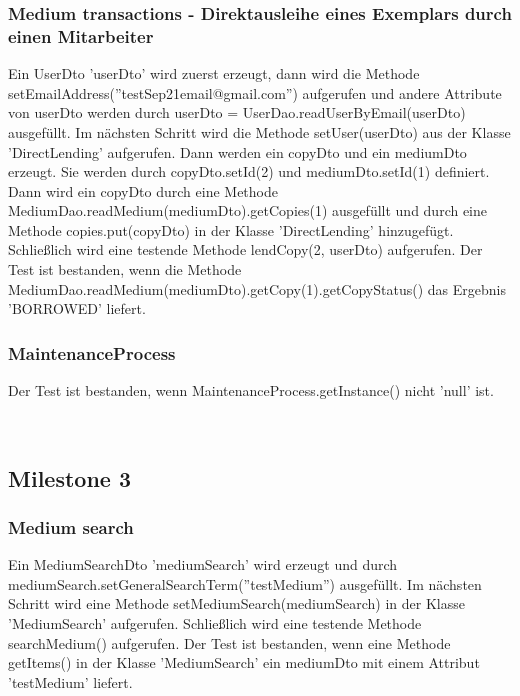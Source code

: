 \documentclass{article}
\begin{document}
\subsubsection{Medium transactions - Direktausleihe eines Exemplars durch einen Mitarbeiter}
Ein UserDto 'userDto' wird zuerst erzeugt, dann wird die Methode \linebreak setEmailAddress(''testSep21email@gmail.com'') aufgerufen und andere Attribute von userDto werden durch userDto = UserDao.readUserByEmail(userDto) ausgefüllt. Im nächsten Schritt wird die Methode setUser(userDto) aus der Klasse 'DirectLending' aufgerufen. Dann werden ein copyDto und ein mediumDto erzeugt. Sie werden durch copyDto.setId(2) und mediumDto.setId(1) definiert. Dann wird ein copyDto durch eine Methode MediumDao.readMedium(mediumDto).getCopies(1) ausgefüllt und durch eine Methode copies.put(copyDto) in der Klasse 'DirectLending' hinzugefügt. Schließlich wird eine testende Methode lendCopy(2, userDto) aufgerufen. Der Test ist bestanden, wenn die Methode MediumDao.readMedium(mediumDto).getCopy(1).getCopyStatus() das Ergebnis 'BORROWED' liefert.

\subsubsection{MaintenanceProcess}
Der Test ist bestanden, wenn MaintenanceProcess.getInstance() nicht 'null' ist.

­\subsection{Milestone 3}
\subsubsection{Medium search}
Ein MediumSearchDto 'mediumSearch' wird erzeugt und durch \linebreak mediumSearch.setGeneralSearchTerm(''testMedium'') ausgefüllt. Im nächsten Schritt wird eine Methode setMediumSearch(mediumSearch) in der Klasse 'MediumSearch' aufgerufen. Schließlich wird eine testende Methode searchMedium() aufgerufen. Der Test ist bestanden, wenn eine Methode getItems() in der Klasse 'MediumSearch' ein mediumDto mit einem Attribut 'testMedium' liefert.
\end{document}
